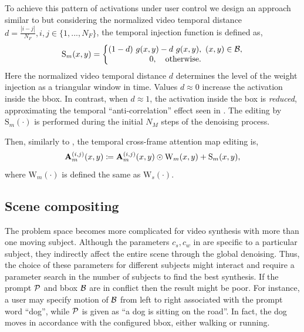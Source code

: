 To achieve this pattern of activations under user control we design an approach similar to  but considering the normalized video temporal distance $d = \frac{|i - j|}{N_F}, i,j \in \{1,...,N_F\}$, the temporal injection function is defined as,
\[
\text{S}_m(x,y) =
    \left\{\begin{matrix}
        (1 - d) \ g(x, y) - d \ g(x, y),\ (x, y) \in \mathcal{B}, \\
        0, \quad \text{otherwise}.
    \end{matrix}\right.
\]
Here the normalized video temporal distance $d$ determines the level of the weight injection as a triangular window in time. Values $d \approx 0$ increase the activation inside the bbox. In contrast, when $d \approx 1$, the activation inside the box is \emph{reduced}, approximating the temporal ``anti-correlation'' effect seen in .  The editing by $\text{S}_m(\cdot)$ is performed during the initial $N_M$ steps of the denoising process. 

Then, similarly to , the temporal cross-frame attention map editing is,
\begin{equation}
    \mathbf{A}_m^{(i,j)}(x,y) \coloneqq \mathbf{A}_m^{(i,j)}(x,y) \odot \text{W}_m(x,y) + \text{S}_m(x,y),
\label{eq:ma}
\end{equation}
where $\text{W}_m(\cdot)$ is defined the same as $\text{W}_s(\cdot)$.


\subsection{Scene compositing}
\label{ssec:comp}

The problem space becomes more complicated for video synthesis with more than one moving subject. Although the parameters $c_s, c_w$ in  are specific to a particular subject, they indirectly affect the entire scene through the global denoising. Thus, the choice of these parameters for different subjects might interact and require a parameter search in the number of subjects to find the best synthesis. If the prompt $\mathcal{P}$ and bbox $\mathcal{B}$ are in conflict then the result might be poor. For instance, a user may specify motion of $\mathcal{B}$ from left to right associated with the prompt word ``dog'', while $\mathcal{P}$ is given as ``a dog is sitting on the road''. In fact, the dog moves in accordance with the configured bbox, either walking or running.

